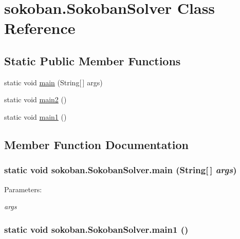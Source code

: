 \hypertarget{classsokoban_1_1SokobanSolver}{
\section{sokoban.SokobanSolver Class Reference}
\label{classsokoban_1_1SokobanSolver}
}
\subsection*{Static Public Member Functions}
\begin{CompactItemize}
\item 
static void \hyperlink{classsokoban_1_1SokobanSolver_2ebdde078f32916e83373aae169567b3}{main} (String\mbox{[}$\,$\mbox{]} args)
\item 
static void \hyperlink{classsokoban_1_1SokobanSolver_23fe5693f4702b6e7d46e155d00555d0}{main2} ()
\item 
static void \hyperlink{classsokoban_1_1SokobanSolver_f34bc3570b0c01991e62200f288131cc}{main1} ()
\end{CompactItemize}


\subsection{Member Function Documentation}
\hypertarget{classsokoban_1_1SokobanSolver_2ebdde078f32916e83373aae169567b3}{
\subsubsection[{main}]{\setlength{\rightskip}{0pt plus 5cm}static void sokoban.SokobanSolver.main (String\mbox{[}$\,$\mbox{]} {\em args})}}
\label{classsokoban_1_1SokobanSolver_2ebdde078f32916e83373aae169567b3}


\begin{Desc}
\item[Parameters:]
\begin{description}
\item[{\em args}]\end{description}
\end{Desc}
\hypertarget{classsokoban_1_1SokobanSolver_f34bc3570b0c01991e62200f288131cc}{
\subsubsection[{main1}]{\setlength{\rightskip}{0pt plus 5cm}static void sokoban.SokobanSolver.main1 ()}}
\label{classsokoban_1_1SokobanSolver_f34bc3570b0c01991e62200f288131cc}


